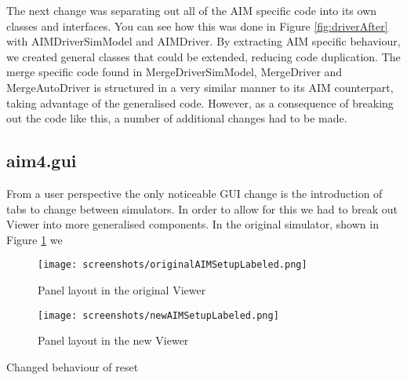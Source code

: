 The next change was separating out all of the AIM specific code into its own classes and interfaces. You can see how this was done in Figure \ref{fig:driverAfter} with AIMDriverSimModel and AIMDriver. By extracting AIM specific behaviour, we created general classes that could be extended, reducing code duplication. The merge specific code found in MergeDriverSimModel, MergeDriver and MergeAutoDriver is structured in a very similar manner to its AIM counterpart, taking advantage of the generalised code. However, as a consequence of breaking out the code like this, a number of additional changes had to be made. 


\subsection{aim4.gui}
\label{subsec:aim4.gui}
From a user perspective the only noticeable GUI change is the introduction of tabs to change between simulators. In order to allow for this we had to break out Viewer into more generalised components. In the original simulator, shown in Figure \ref{fig:originalAIMSetupLabeled} we 

\begin{figure}[htb]
\texttt{[image: screenshots/originalAIMSetupLabeled.png]}
\caption{Panel layout in the original Viewer}
\label{fig:originalAIMSetupLabeled}
\end{figure}

\begin{figure}[htb]
\texttt{[image: screenshots/newAIMSetupLabeled.png]}
\caption{Panel layout in the new Viewer}
\label{fig:newAIMSetupLabeled}
\end{figure}

Changed behaviour of reset


